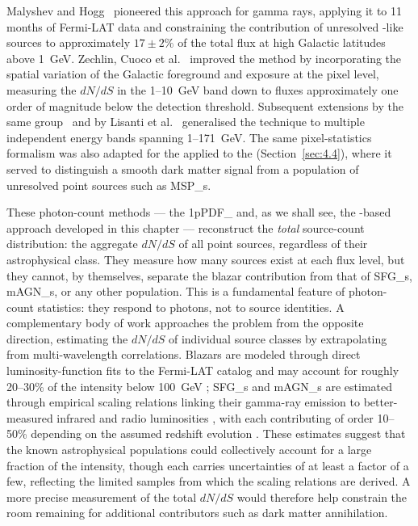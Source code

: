 Malyshev and Hogg~\cite{malyshev2011statistics} pioneered this approach for gamma rays, applying it to 11 months of Fermi-LAT data and constraining the contribution of unresolved \AGN-like sources to approximately $17 \pm 2\%$ of the total flux at high Galactic latitudes above 1~GeV.
Zechlin, Cuoco et al.~\cite{Cuoco-1pdf} improved the method by incorporating the spatial variation of the Galactic foreground and exposure at the pixel level, measuring the $dN/dS$ in the 1--10~GeV band down to fluxes approximately one order of magnitude below the detection threshold.
Subsequent extensions by the same group~\cite{Zechlin:2016pme} and by Lisanti et al.~\cite{Lisanti:2016jub} generalised the technique to multiple independent energy bands spanning 1--171~GeV.
The same pixel-statistics formalism was also adapted for the \NPTF applied to the \GCE (Section~\ref{sec:4.4}), where it served to distinguish a smooth dark matter signal from a population of unresolved point sources such as \glspl{MSP_}.

These photon-count methods --- the \gls{1pPDF_} and, as we shall see, the \CNN-based approach developed in this chapter --- reconstruct the \emph{total} source-count distribution: the aggregate $dN/dS$ of all point sources, regardless of their astrophysical class.
They measure how many sources exist at each flux level, but they cannot, by themselves, separate the blazar contribution from that of \glspl{SFG_}, \glspl{mAGN_}, or any other population.
This is a fundamental feature of photon-count statistics: they respond to photons, not to source identities.
A complementary body of work approaches the problem from the opposite direction, estimating the $dN/dS$ of individual source classes by extrapolating from multi-wavelength correlations.
Blazars are modeled through direct luminosity-function fits to the Fermi-LAT catalog and may account for roughly 20--30\% of the \UGRB intensity below 100~GeV \cite{Ajello:2015mfa}; \glspl{SFG_} and \glspl{mAGN_} are estimated through empirical scaling relations linking their gamma-ray emission to better-measured infrared and radio luminosities \cite{Fermi-LAT:2012nqz,Inoue:2011bm,DiMauro:2014wha}, with each contributing of order 10--50\% depending on the assumed redshift evolution \cite{DGRB-review}.
These estimates suggest that the known astrophysical populations could collectively account for a large fraction of the \UGRB intensity, though each carries uncertainties of at least a factor of a few, reflecting the limited samples from which the scaling relations are derived.
A more precise measurement of the total $dN/dS$ would therefore help constrain the room remaining for additional contributors such as dark matter annihilation.
